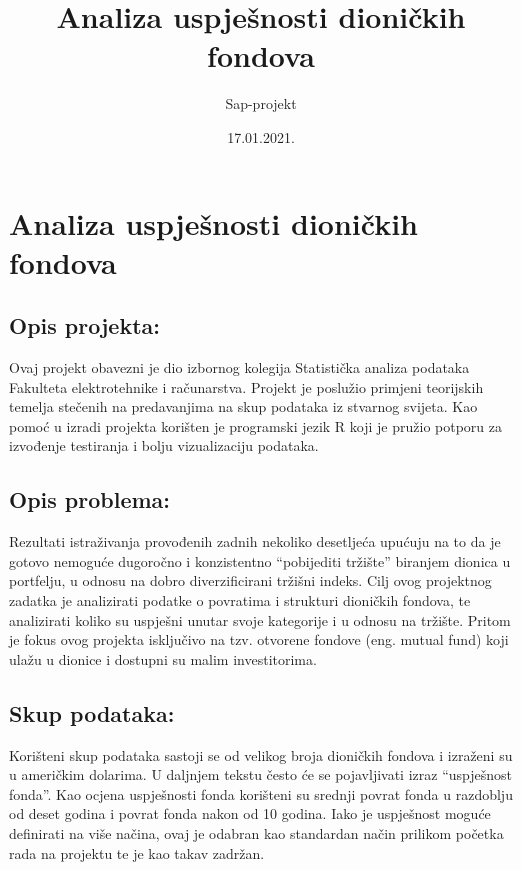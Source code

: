 \documentclass[
]{article}
\title{Analiza uspješnosti dioničkih fondova}
\author{Sap-projekt}
\date{17.01.2021.}
\begin{document}
\maketitle

\hypertarget{analiza-uspjeux161nosti-dioniux10dkih-fondova}{%
\section{Analiza uspješnosti dioničkih
fondova}\label{analiza-uspjeux161nosti-dioniux10dkih-fondova}}

\hypertarget{opis-projekta}{%
\subsection{Opis projekta:}\label{opis-projekta}}

Ovaj projekt obavezni je dio izbornog kolegija Statistička analiza
podataka Fakulteta elektrotehnike i računarstva. Projekt je poslužio
primjeni teorijskih temelja stečenih na predavanjima na skup podataka iz
stvarnog svijeta. Kao pomoć u izradi projekta korišten je programski
jezik R koji je pružio potporu za izvođenje testiranja i bolju
vizualizaciju podataka.

\hypertarget{opis-problema}{%
\subsection{Opis problema:}\label{opis-problema}}

Rezultati istraživanja provođenih zadnih nekoliko desetljeća upućuju na
to da je gotovo nemoguće dugoročno i konzistentno ``pobijediti tržište''
biranjem dionica u portfelju, u odnosu na dobro diverzificirani tržišni
indeks. Cilj ovog projektnog zadatka je analizirati podatke o povratima
i strukturi dioničkih fondova, te analizirati koliko su uspješni unutar
svoje kategorije i u odnosu na tržište. Pritom je fokus ovog projekta
isključivo na tzv. otvorene fondove (eng. mutual fund) koji ulažu u
dionice i dostupni su malim investitorima.

\hypertarget{skup-podataka}{%
\subsection{Skup podataka:}\label{skup-podataka}}

Korišteni skup podataka sastoji se od velikog broja dioničkih fondova i
izraženi su u američkim dolarima. U daljnjem tekstu često će se
pojavljivati izraz ``uspješnost fonda''. Kao ocjena uspješnosti fonda
korišteni su srednji povrat fonda u razdoblju od deset godina i povrat
fonda nakon od 10 godina. Iako je uspješnost moguće definirati na više
načina, ovaj je odabran kao standardan način prilikom početka rada na
projektu te je kao takav zadržan.
\end{document}
